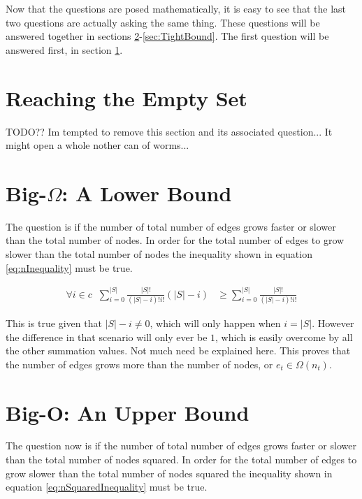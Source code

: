 \documentclass{article}
\begin{document}
Now that the questions are posed mathematically, it is easy to see that the last two questions are actually asking the same thing. These questions will be answered together in sections \ref{sec:LowerBound}-\ref{sec:TightBound}. The first question will be answered first, in section \ref{sec:ReachingTheEmptySet}.

\section{Reaching the Empty Set}
\label{sec:ReachingTheEmptySet}

TODO?? Im tempted to remove this section and its associated question... It might open a whole nother can of worms...


\section{Big-$\Omega$: A Lower Bound}
\label{sec:LowerBound}

The question is if the number of total number of edges grows faster or slower than the total number of nodes. In order for the total number of edges to grow slower than the total number of nodes the inequality shown in equation \ref{eq:nInequality} must be true.

\begin{equation}
    \begin{split}
        \forall i\in c\;\; \sum_{i=0}^{|S|}\frac{|S|!}{(|S|-i)!i!}(|S|-i) & \ge \sum_{i=0}^{|S|}\frac{|S|!}{(|S|-i)!i!}
    \end{split}
    \label{eq:nInequality}
\end{equation}

This is true given that $|S|-i\neq0$, which will only happen when $i=|S|$. However the difference in that scenario will only ever be $1$, which is easily overcome by all the other summation values. Not much need be explained here. This proves that the number of edges grows more than the number of nodes, or $e_t\in \Omega(n_t)$.

\section{Big-O: An Upper Bound}
\label{sec:UpperBound}

The question now is if the number of total number of edges grows faster or slower than the total number of nodes squared. In order for the total number of edges to grow slower than the total number of nodes squared the inequality shown in equation \ref{eq:nSquaredInequality} must be true.
\end{document}
